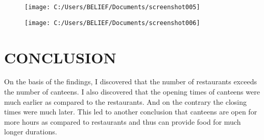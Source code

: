 \documentclass[]{report}
\begin{document}
\begin{figure}
	\centering
	\texttt{[image: C:/Users/BELIEF/Documents/screenshot005]}
	\caption{}
	\label{fig:screenshot005}
\end{figure}

\begin{figure}
	\centering
	\texttt{[image: C:/Users/BELIEF/Documents/screenshot006]}
	\caption{}
	\label{fig:screenshot006}
\end{figure}
   
 \section*{CONCLUSION}
 On the basis of the findings, I discovered that the number of restaurants exceeds the number of canteens. I also discovered that the opening times of canteens were much earlier as compared to the restaurants. And on the contrary the closing times were much later. This led to another conclusion that canteens are open for more hours as compared to restaurants and thus can provide food for much longer durations.
\end{document}
